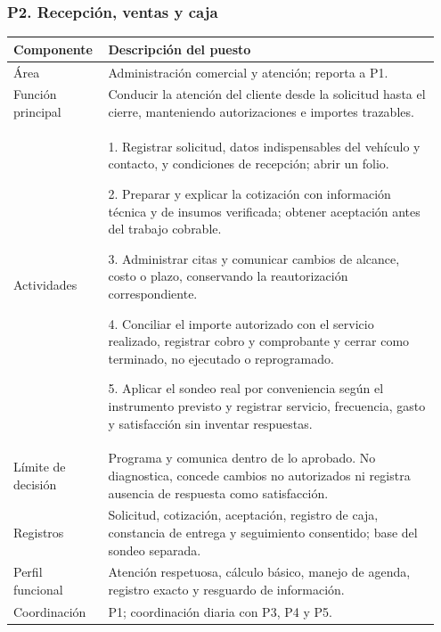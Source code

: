 {\par\medskip\noindent\begin{minipage}{\linewidth}\subsubsection*{P2. Recepción, ventas y caja}
{\small\renewcommand{\arraystretch}{1.15}\begin{tabular}{@{}p{0.20\linewidth}p{0.75\linewidth}@{}}\toprule
\textbf{Componente} & \textbf{Descripción del puesto} \\ \midrule
Área & Administración comercial y atención; reporta a P1. \\ \midrule
Función principal & Conducir la atención del cliente desde la solicitud hasta el cierre, manteniendo autorizaciones e importes trazables. \\ \midrule
Actividades & 1. Registrar solicitud, datos indispensables del vehículo y contacto, y condiciones de recepción; abrir un folio.\par 2. Preparar y explicar la cotización con información técnica y de insumos verificada; obtener aceptación antes del trabajo cobrable.\par 3. Administrar citas y comunicar cambios de alcance, costo o plazo, conservando la reautorización correspondiente.\par 4. Conciliar el importe autorizado con el servicio realizado, registrar cobro y comprobante y cerrar como terminado, no ejecutado o reprogramado.\par 5. Aplicar el sondeo real por conveniencia según el instrumento previsto y registrar servicio, frecuencia, gasto y satisfacción sin inventar respuestas. \\ \midrule
Límite de decisión & Programa y comunica dentro de lo aprobado. No diagnostica, concede cambios no autorizados ni registra ausencia de respuesta como satisfacción. \\ \midrule
Registros & Solicitud, cotización, aceptación, registro de caja, constancia de entrega y seguimiento consentido; base del sondeo separada. \\ \midrule
Perfil funcional & Atención respetuosa, cálculo básico, manejo de agenda, registro exacto y resguardo de información. \\ \midrule
Coordinación & P1; coordinación diaria con P3, P4 y P5. \\ \midrule
\end{tabular}}\end{minipage}\par\medskip
}
